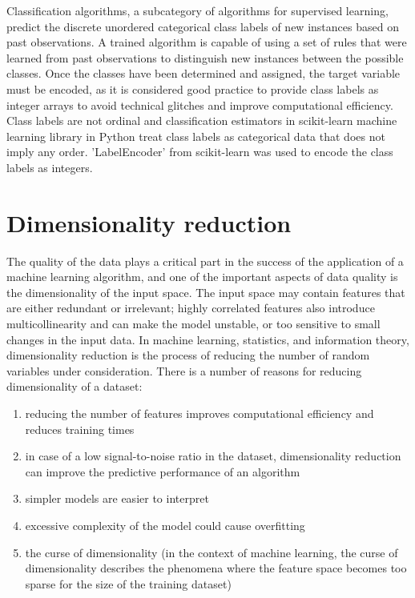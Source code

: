 Classification algorithms, a subcategory of algorithms for supervised learning, predict the discrete unordered categorical class labels of new instances based on past observations.
A trained algorithm is capable of using a set of rules that were learned from past observations to distinguish new instances between the possible classes.
Once the classes have been determined and assigned, the target variable must be encoded, as it is considered good practice to provide class labels as integer arrays to avoid technical glitches and improve computational efficiency.
Class labels are not ordinal and classification estimators in scikit-learn\cite{scikit-learn} machine learning library in Python treat class labels as categorical data that does not imply any order.
'LabelEncoder' from scikit-learn was used to encode the class labels as integers.

\section{Dimensionality reduction} \label{sec:dimensionality_reduction}

The quality of the data plays a critical part in the success of the application of a machine learning algorithm, and one of the important aspects of data quality is the dimensionality of the input space.
The input space may contain features that are either redundant or irrelevant;
highly correlated features also introduce multicollinearity and can make the model unstable, or too sensitive to small changes in the input data.
In machine learning, statistics, and information theory, dimensionality reduction is the process of reducing the number of random variables under consideration.
There is a number of reasons for reducing dimensionality of a dataset:

\begin{enumerate}
    \item reducing the number of features improves computational efficiency and reduces training times
    \item in case of a low signal-to-noise ratio in the dataset, dimensionality reduction can improve the predictive performance of an algorithm\cite{RaschkaMirjalili2017}
    \item simpler models are easier to interpret\cite{James2013}
    \item excessive complexity of the model could cause overfitting\cite{RaschkaMirjalili2017}
    \item the curse of dimensionality\cite{Bellman1954} (in the context of machine learning, the curse of dimensionality describes the phenomena where the feature space becomes too sparse for the size of the training dataset)\cite{RaschkaMirjalili2017}
\end{enumerate}

